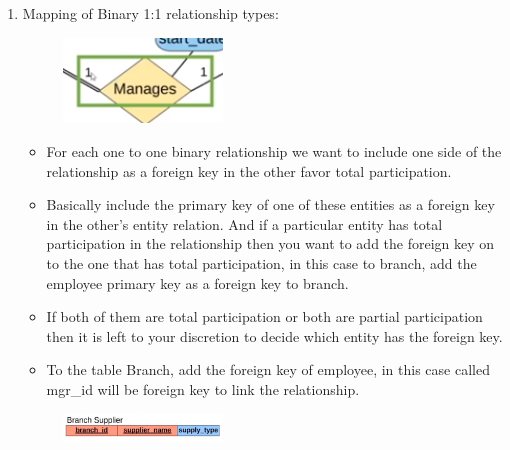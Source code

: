 \begin{enumerate}
    \item Mapping of Binary 1:1 relationship types:
        \begin{figure}[H]
            \centering
            \includegraphics[width=0.4\textwidth]{./Figs/2020-12-24-23-00-49.png}
        \end{figure}
        \begin{itemize}
            \item For each one to one binary relationship we want to include one side of the relationship as a foreign key in the other favor total participation.
            \item Basically include the primary key of one of these entities as a foreign key in the other's entity relation. And if a particular entity has total participation in the relationship then you want to add the foreign key on to the one that has total participation, in this case to branch, add the employee primary key as a foreign key to branch.
            \item If both of them are total participation or both are partial participation then it is left to your discretion to decide which entity has the foreign key.
            \item To the table Branch, add the foreign key of employee, in this case called mgr\_id will be foreign key to link the relationship.
        \end{itemize}
        \begin{figure}[H]
            \centering
            \includegraphics[width=0.4\textwidth]{./Figs/2020-12-24-23-05-49.png}
        \end{figure}
    

\end{enumerate}
